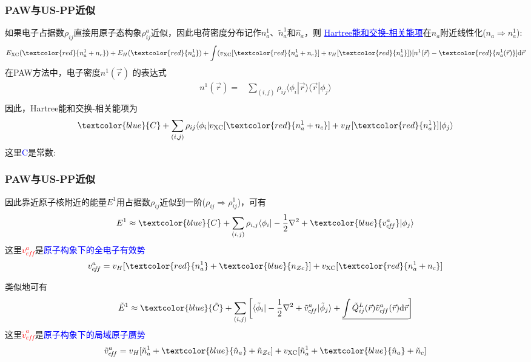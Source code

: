 \frame
{
	\frametitle{\textrm{PAW}与\textrm{US-PP}近似}
	
	如果电子占据数$\rho_{ij}$直接用原子态构象$\rho_{ij}^a$近似，因此电荷密度分布记作$n_a^1$、$\tilde n_a^1$和$\hat n_a$，则%
	\textcolor{blue}{\underline{\textrm{Hartree}能和交换-相关能项}}在$n_a$附近线性化($n_a\Rightarrow n_a^1$):
	\begin{displaymath}
		E_{\mathrm{XC}}(\textcolor{red}{n_a^1+n_c})+E_H(\textcolor{red}{n_a^1})+\int(v_{\mathrm{XC}}[\textcolor{red}{n_a^1+n_c}]+v_H[\textcolor{red}{n_a^1}])[n^1(\vec r)-\textcolor{red}{n_a^1(\vec r)}]\mathrm{d}\vec r
	\end{displaymath}
	在\textrm{PAW}方法中，电子密度$n^1(\vec r)$%
	的表达式
	\begin{displaymath}
		\begin{aligned}
			n^1(\vec r)=&\sum_{(i,j)}\rho_{ij}\langle\phi_i|\vec r\rangle\langle\vec r|\phi_j\rangle\\
		\end{aligned}
	\end{displaymath}
	因此，\textrm{Hartree}能和交换-相关能项为
	$$\textcolor{blue}{C}+\sum_{(i,j)}\rho_{ij}\langle\phi_i|v_{\mathrm{XC}}[\textcolor{red}{n_a^1+n_c}]+v_H[\textcolor{red}{n_a^1}]|\phi_j\rangle$$
	这里\textcolor{blue}{\textrm{C}}是常数:~{\fontsize{7.1pt}{3.9pt}}
}

\frame
{
	\frametitle{\textrm{PAW}与\textrm{US-PP}近似}
	因此靠近原子核附近的能量$E^1$用占据数$\rho_{ij}$近似到一阶($\rho_{ij}\Rightarrow\rho_{ij}^1$)，可有
	\begin{displaymath}
		E^1\approx\textcolor{blue}{C}+\sum_{(i,j)}\rho_{i,j}\langle\phi_i|-\frac12\nabla^2+\textcolor{blue}{v_{e\!f\!f}^a}|\phi_j\rangle
	\end{displaymath}
	这里\textcolor{red}{$v_{e\!f\!f}^a$}是\textcolor{blue}{原子构象下的全电子有效势}
	\begin{displaymath}
		v_{e\!f\!f}^a=v_H[\textcolor{red}{n_a^1}+\textcolor{blue}{n_{Zc}}]+v_{\mathrm{XC}}[\textcolor{red}{n_a^1+n_c}]
	\end{displaymath}

	类似地可有
	\begin{displaymath}
		\tilde E^1\approx\textcolor{blue}{\tilde C}+\sum_{(i,j)}\left[\langle\tilde\phi_i|-\frac12\nabla^2+\tilde v_{e\!f\!f}^a|\tilde\phi_j\rangle+\underline{\int\tilde Q_{ij}^L(\vec r)\tilde v_{e\!f\!f}^a(\vec r)\mathrm{d}\vec r}\right]
	\end{displaymath}
	这里\textcolor{red}{$\tilde v_{e\!f\!f}^a$}是\textcolor{blue}{原子构象下的局域原子赝势}
	$$\tilde v_{e\!f\!f}^a=v_H[\tilde n_a^1+\textcolor{blue}{\hat n_a}+\tilde n_{Zc}]+v_{\mathrm{XC}}[\tilde n_a^1+\textcolor{blue}{\hat n_a}+\tilde n_c]$$
}

